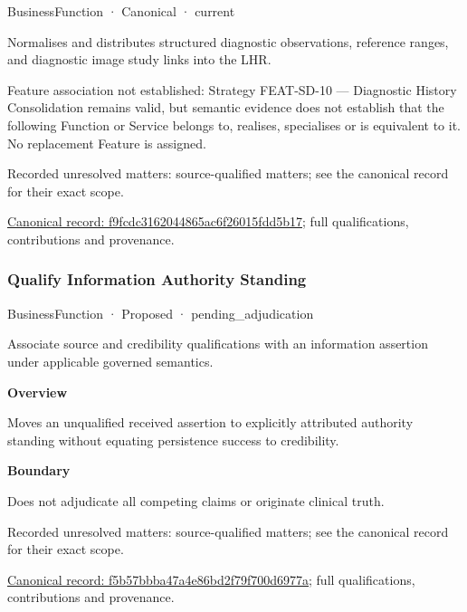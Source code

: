 \label{element:f9fcdc3162044865ac6f26015fdd5b17}
{\small BusinessFunction · Canonical · current}\par

Normalises and distributes structured diagnostic observations, reference ranges, and diagnostic image study links into the LHR.



Feature association not established: Strategy FEAT-SD-10 — Diagnostic History Consolidation remains valid, but semantic evidence does not establish that the following Function or Service belongs to, realises, specialises or is equivalent to it. No replacement Feature is assigned.


{\small Recorded unresolved matters: source-qualified matters; see the canonical record for their exact scope.}\par
{\footnotesize \href{../../../../continuum/business/business-function/f9fcdc3162044865ac6f26015fdd5b17.md}{Canonical record: f9fcdc3162044865ac6f26015fdd5b17}; full qualifications, contributions and provenance.}\par
\subsubsection{Qualify Information Authority Standing}

\label{element:f5b57bbba47a4e86bd2f79f700d6977a}
{\small BusinessFunction · Proposed · pending\_adjudication}\par

Associate source and credibility qualifications with an information assertion under applicable governed semantics.



\textbf{Overview}



Moves an unqualified received assertion to explicitly attributed authority standing without equating persistence success to credibility.



\textbf{Boundary}



Does not adjudicate all competing claims or originate clinical truth.


{\small Recorded unresolved matters: source-qualified matters; see the canonical record for their exact scope.}\par
{\footnotesize \href{../../../../continuum/business/business-function/f5b57bbba47a4e86bd2f79f700d6977a.md}{Canonical record: f5b57bbba47a4e86bd2f79f700d6977a}; full qualifications, contributions and provenance.}\par
